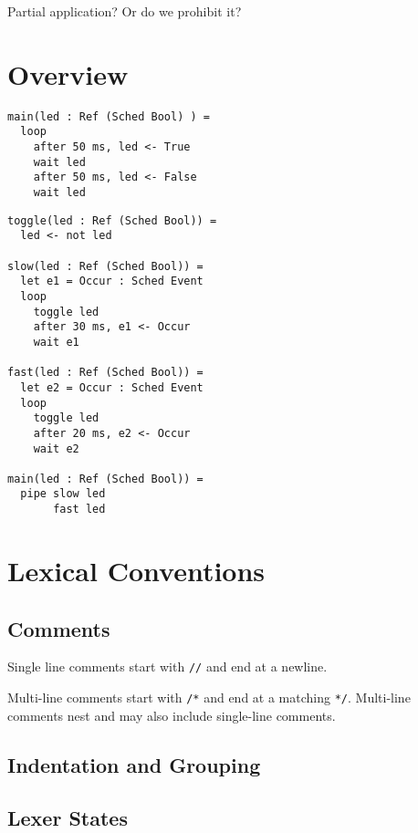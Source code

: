 \documentclass{article}
\begin{document}
Partial application?  Or do we prohibit it?

\section{Overview}

\begin{lstlisting}
main(led : Ref (Sched Bool) ) =
  loop
    after 50 ms, led <- True
    wait led
    after 50 ms, led <- False
    wait led
\end{lstlisting}

\begin{lstlisting}
toggle(led : Ref (Sched Bool)) =
  led <- not led

slow(led : Ref (Sched Bool)) =
  let e1 = Occur : Sched Event
  loop
    toggle led
    after 30 ms, e1 <- Occur
    wait e1

fast(led : Ref (Sched Bool)) =
  let e2 = Occur : Sched Event
  loop
    toggle led
    after 20 ms, e2 <- Occur
    wait e2
    
main(led : Ref (Sched Bool)) =
  pipe slow led
       fast led
\end{lstlisting}

\section{Lexical Conventions}

\subsection{Comments}

Single line comments start with \lstinline!//! and end at a newline.

Multi-line comments start with \lstinline!/*! and end at a matching
\lstinline!*/!.  Multi-line comments nest and may also include
single-line comments.

\subsection{Indentation and Grouping}

\subsection{Lexer States}
\end{document}
